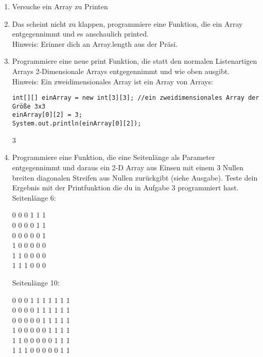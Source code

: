 \documentclass{../../sheet}
\begin{document}
\newpage
{}


\begin{enumerate}
    \item Versuche ein Array zu Printen
    \item Das scheint nicht zu klappen, programmiere eine Funktion, die ein Array entgegennimmt und es anschaulich printed.\\
          Hinweis: Erinner dich an Array.length aus der Präsi.
    \item Programmiere eine neue print Funktion, die statt den normalen Listenartigen Arrays 2-Dimensionale Arrays entgegennimmt und wie oben ausgibt.\\
    Hinweis: Ein zweidimensionales Array ist ein Array von Arrays:
    \begin{verbatim}
int[][] einArray = new int[3][3]; //ein zweidimensionales Array der Größe 3x3
einArray[0][2] = 3;
System.out.println(einArray[0][2]);
    \end{verbatim}
    \begin{ausgabe}
        3
    \end{ausgabe}
    \item Programmiere eine Funktion, die eine Seitenlänge als Parameter entgegennimmt und daraus ein 2-D Array aus Einsen mit einem 3 Nullen breiten diagonalen Streifen aus Nullen zurückgibt (siehe Ausgabe). Teste dein Ergebnis mit der Printfunktion die du in Aufgabe 3 programmiert hast.\\
          Seitenlänge 6:
          \begin{ausgabe}
              0 0 0 1 1 1\\
              0 0 0 0 1 1\\
              0 0 0 0 0 1\\
              1 0 0 0 0 0\\
              1 1 0 0 0 0\\
              1 1 1 0 0 0
          \end{ausgabe}
          Seitenlänge 10:
          \begin{ausgabe}
              0 0 0 1 1 1 1 1 1 1 \\
              0 0 0 0 1 1 1 1 1 1 \\
              0 0 0 0 0 1 1 1 1 1 \\
              1 0 0 0 0 0 1 1 1 1 \\
              1 1 0 0 0 0 0 1 1 1 \\
              1 1 1 0 0 0 0 0 1 1 \\

\end{ausgabe}
\end{enumerate}
\end{document}
